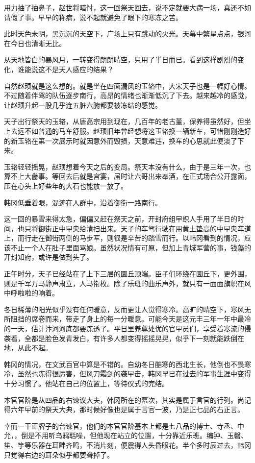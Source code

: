 用力抽了抽鼻子，赵世将暗忖，这一回祭天回去，说不定就要大病一场，真还不如请假了事。早早的称病，说不起就避免了眼下的寒冻之苦。

此时天色未明，黑沉沉的天空下，广场上只有跳动的火光。天幕中繁星点点，银河在今日也清晰无比。

从天地皆白的暴风月，一转变得朗朗晴空，只用了半日而已。看到这样剧烈的变化，谁能说这不是天人感应的结果？

自然赵顼就是这么想的。就是坐在四面漏风的玉辂中，大宋天子也是一幅好心情。不过随着伴驾的队伍逐步南行，高昂的情绪也渐渐低沉了下去。越来越冷的感觉，让赵顼升起一股几乎连五脏六腑都要被冻结的感觉。

天子出行祭天的玉辂，从唐高宗用到现在，几百年的老古董，保养得虽然好，但坐上去远不如普通的马车舒服。赵顼旧年曾经想将这玉辂换一辆新车，可惜刚刚造好的新玉辂在第一次展示时就因意外而毁损，天意难违，换车的心思就此便淡了下来。

玉辂轻轻摇晃，赵顼想着今天之后的变局。祭天本没有什么，由于是三年一次，也算不上大齤事。等回去后就是宫宴，届时让六哥出来奉酒，在正式场合公开露面，压在心头上好些年的大石也能放一放了。

韩冈低垂着眼，混迹在人群中，沿着御街一路南行。

这一回的暴雪来得太急，偏偏又赶在祭天之前，开封府组曱织人手用了半日的时间，也只将御街正中曱央给清扫出来。天子的车驾行驶在用黄土垫高的中曱央车道上，而行走在御街两侧的马步军，则很是辛苦的踏雪而行。以韩冈看到的情况，应该不止一个人在肚子里面骂娘。虽然状况情有可原，但加上青城军营的事，钱藻的开封知府，或许是做到头了。

正午时分，天子已经站在了上下三层的圜丘顶端。臣子们环绕在圜丘下，更外围，则是千军万马静声肃立，人马衔枚。除了乐班的曲乐声外，就只有一面面旗帜在风中呼啦啦的响着。

冬日稀薄的阳光似乎没有任何暖意，反而更让人觉得寒冷。高旷的晴空下，寒风无所阻挡的席卷而来，带走了身上的每一分暖意。可能今天是这元丰三年一年中最冷的一天，估计汴河河底都要冻透了。平日里养尊处优的官曱员们，享受着寒流的侵袭看，全都是脸色发青发白，有许多人都变得摇摇晃晃，似乎下一刻就能跌倒在地，从此不起。

韩冈的情况，在文武百官中算是不错的。自幼冬日酷寒的西北生长，他倒也不畏寒冷，虽然也冻得很厉害，但风刀霜剑的袭曱击，韩冈早已在过去的军事生涯中变得十分习惯了。他站在自己的位置上，等待仪式的完结。

本官官阶是从四品的右谏议大夫，韩冈所在的幕次，其实是属于言官的行列。尚记得六年曱前的祭天大典，那时候好像也是属于言官一波，乃是正七品的右正言。

幸而一干正牌子的台谏官，他们的本官官阶基本上都是七八品的博士、寺丞、中允，，倒是不用听乌鸦聒噪，但他现在站立的位置，十分靠近乐班。编钟、玉磬、笙、竽等乐器在耳畔齐鸣，不消片刻，便震得人头昏眼花。半个多时辰过去，韩冈只觉得右边的耳朵似乎都要聋掉了。

